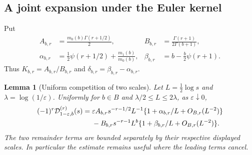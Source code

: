 \documentclass[11pt,a4paper]{article}
\numberwithin{equation}{section}
\newtheorem{lemma}[theorem]{Lemma}
\theoremstyle{definition}
\theoremstyle{remark}
\begin{document}
\subsection{A joint expansion under the Euler kernel}

Put
\begin{align}
 A_{b,r}&=\frac{m_0(b)\Gamma(r+1/2)}2,
 & B_{b,r}&=\frac{\Gamma(r+1)}{2\Gamma(b+1)},
 \label{eutrans:eq:AB}\\
 \alpha_{b,r}&=\frac12\psi(r+1/2)+\frac{m_1(b)}{m_0(b)},
 & \beta_{b,r}&=b-\frac b2\psi(r+1).
 \label{eutrans:eq:alphabeta}
\end{align}
Thus $K_{b,r}=A_{b,r}/B_{b,r}$ and
$\delta_{b,r}=\beta_{b,r}-\alpha_{b,r}$.

\begin{lemma}[Uniform competition of two scales]
\label{eutrans:lem:joint}
Let $L=\tfrac12\log s$ and $\lambda=\log(1/\varepsilon)$. Uniformly
for $b\in B$ and $\lambda/2\leq L\leq2\lambda$, as
$\varepsilon\downarrow0$,
\begin{align}
 (-1)^r\mathcal D_{1-\varepsilon,b}^{(r)}(s)
 ={}&\varepsilon A_{b,r}s^{-r-1/2}L^{-1}
       \{1+\alpha_{b,r}/L+O_{B,r}(L^{-2})\}\notag\\
 &-B_{b,r}s^{-r-1}L^b
       \{1+\beta_{b,r}/L+O_{B,r}(L^{-2})\}.
 \label{eutrans:eq:joint}
\end{align}
The two remainder terms are bounded separately by their respective
displayed scales. In particular the estimate remains useful where
the leading terms cancel.
\end{lemma}
\end{document}
